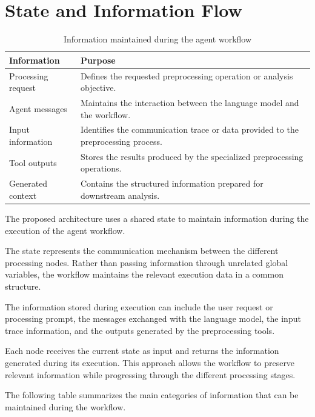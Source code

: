 \section{State and Information Flow}
\begin{table}[H]
\centering
\caption{Information maintained during the agent workflow}
\label{tab:state_information}

\begin{tabular}{p{} p{}}
\toprule
\textbf{Information} & \textbf{Purpose} \\
\midrule

Processing request &
Defines the requested preprocessing operation or analysis objective. \\

Agent messages &
Maintains the interaction between the language model and the workflow. \\

Input information &
Identifies the communication trace or data provided to the preprocessing process. \\

Tool outputs &
Stores the results produced by the specialized preprocessing operations. \\

Generated context &
Contains the structured information prepared for downstream analysis. \\

\bottomrule
\end{tabular}
\end{table}
The proposed architecture uses a shared state to maintain information during the execution of the agent workflow.

The state represents the communication mechanism between the different processing nodes. Rather than passing information through unrelated global variables, the workflow maintains the relevant execution data in a common structure.

The information stored during execution can include the user request or processing prompt, the messages exchanged with the language model, the input trace information, and the outputs generated by the preprocessing tools.

Each node receives the current state as input and returns the information generated during its execution. This approach allows the workflow to preserve relevant information while progressing through the different processing stages.

The following table summarizes the main categories of information that can be maintained during the workflow.



